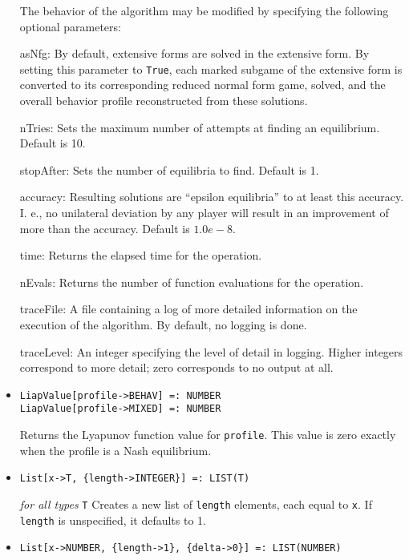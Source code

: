 \begin{itemize}
The behavior of the algorithm may be modified by specifying the following
optional parameters:
\bd
\item
[asNfg:] By default, extensive forms are solved in the extensive form.
By setting this parameter to \verb+True+, each marked subgame of the
extensive form is converted to its corresponding reduced normal form game,
solved, and the overall behavior profile reconstructed from these
solutions.
\item
[nTries:] Sets the maximum number of attempts at finding an
equilibrium. Default is 10.
\item
[stopAfter:] Sets the number of equilibria to find.  Default is 1.
\item
[accuracy:] Resulting solutions are ``epsilon equilibria'' to at least
this accuracy.  I. e., no unilateral deviation by any player will
result in an improvement of more than the accuracy.  Default is
$1.0e-8$.
\item
[time:] Returns the elapsed time for the operation.
\item
[nEvals:] Returns the number of function evaluations for the operation.
\item
[traceFile:] A file containing a log of more detailed information on the
execution of the algorithm.  By default, no logging is done.
\item
[traceLevel:] An integer specifying the level of detail in logging.
Higher integers correspond to more detail; zero corresponds to no output
at all.
\ed
\ed

\item{}
\protect \large \begin{verbatim}
LiapValue[profile->BEHAV] =: NUMBER 
LiapValue[profile->MIXED] =: NUMBER 
\end{verbatim} \normalsize

\bd 
Returns the Lyapunov function value for \verb+profile+.
This value is zero exactly when the
profile is a Nash equilibrium.
\ed

\item{}
\protect \large \begin{verbatim}
List[x->T, {length->INTEGER}] =: LIST(T)
\end{verbatim}\normalsize

{\it for all types} {\tt T}
\bd
Creates a new list of \verb+length+ elements, each equal to \verb+x+.
If \verb+length+ is unspecified, it defaults to 1.
\ed

\item{}
\protect \large \begin{verbatim}
List[x->NUMBER, {length->1}, {delta->0}] =: LIST(NUMBER) 
\end{verbatim}\normalsize


\end{itemize}

